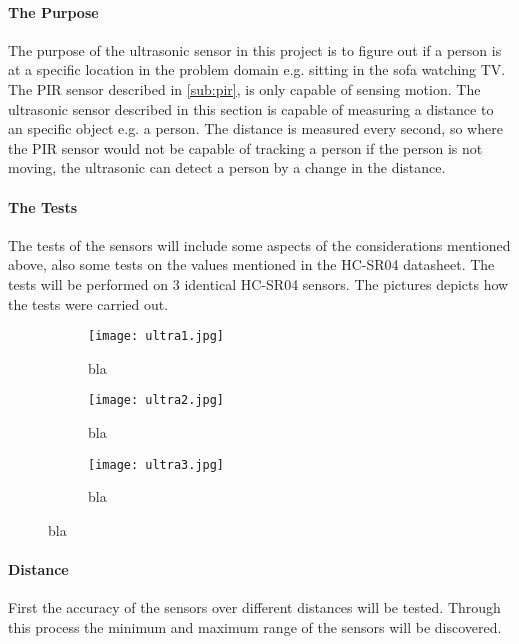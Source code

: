 \paragraph{The Purpose}
The purpose of the ultrasonic sensor in this project is to figure out if a person is at a specific location in the problem domain e.g. sitting in the sofa watching TV. The PIR sensor described in \cref{sub:pir}, is only capable of sensing motion. The ultrasonic sensor described in this section is capable of measuring a distance to an specific object e.g. a person. The distance is measured every second, so where the PIR sensor would not be capable of tracking a person if the person is not moving, the ultrasonic can detect a person by a change in the distance.

\paragraph{The Tests} The tests of the sensors will include some aspects of the considerations mentioned above, also some tests on the values mentioned in the HC-SR04 datasheet\cite{hcsr04}. The tests will be performed on 3 identical HC-SR04 sensors. The pictures  depicts how the tests were carried out.

\begin{figure}[htbp]
  \begin{subfigure}{.3\textwidth}
    \centering
    \texttt{[image: ultra1.jpg]}
    \caption{bla}
    \label{fig:ultra1}
  \end{subfigure}
  \begin{subfigure}{.3\textwidth}
    \centering
    \texttt{[image: ultra2.jpg]}
    \caption{bla}
    \label{fig:ultra2}
  \end{subfigure}
  \begin{subfigure}{.3\textwidth}
    \centering
    \texttt{[image: ultra3.jpg]}
    \caption{bla}
    \label{fig:ultra3}
  \end{subfigure}
\end{figure}
  
\paragraph{Distance}
First the accuracy of the sensors over different distances will be tested. Through this process the minimum and maximum range of the sensors will be discovered. 

